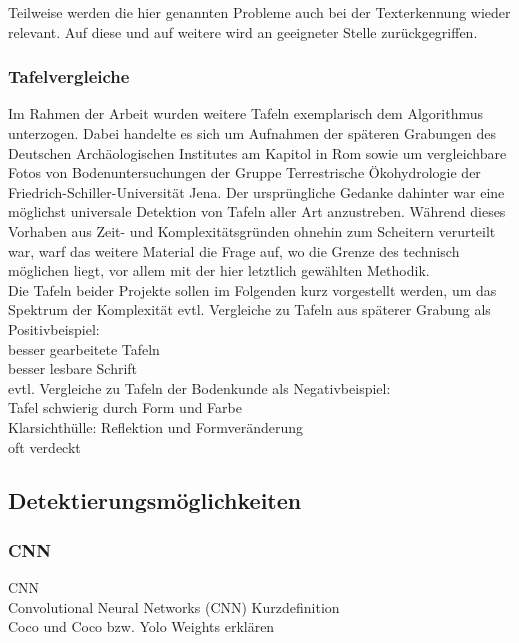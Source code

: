 Teilweise werden die hier genannten Probleme auch bei der Texterkennung wieder relevant. Auf diese und auf weitere wird an geeigneter Stelle zurückgegriffen.

\subsubsection{Tafelvergleiche}

Im Rahmen der Arbeit wurden weitere Tafeln exemplarisch dem Algorithmus unterzogen. Dabei handelte es sich um Aufnahmen der späteren Grabungen des Deutschen Archäologischen Institutes am Kapitol in Rom sowie um vergleichbare Fotos von Bodenuntersuchungen der Gruppe Terrestrische Ökohydrologie der Friedrich-Schiller-Universität Jena. Der ursprüngliche Gedanke dahinter war eine möglichst universale Detektion von Tafeln aller Art anzustreben. Während dieses Vorhaben aus Zeit- und Komplexitätsgründen ohnehin zum Scheitern verurteilt war, warf das weitere Material die Frage auf, wo die Grenze des technisch möglichen liegt, vor allem mit der hier letztlich gewählten Methodik.\\
Die Tafeln beider Projekte sollen im Folgenden kurz vorgestellt werden, um das Spektrum der Komplexität 
evtl. Vergleiche zu Tafeln aus späterer Grabung als Positivbeispiel:\\
besser gearbeitete Tafeln\\
besser lesbare Schrift\\
evtl. Vergleiche zu Tafeln der Bodenkunde als Negativbeispiel:\\
Tafel schwierig durch Form und Farbe\\
Klarsichthülle: Reflektion und Formveränderung\\
oft verdeckt\\

\subsection{Detektierungsmöglichkeiten}

\subsubsection{CNN}

CNN\\

Convolutional Neural Networks (CNN) Kurzdefinition\\

Coco und Coco bzw. Yolo Weights erklären\\

